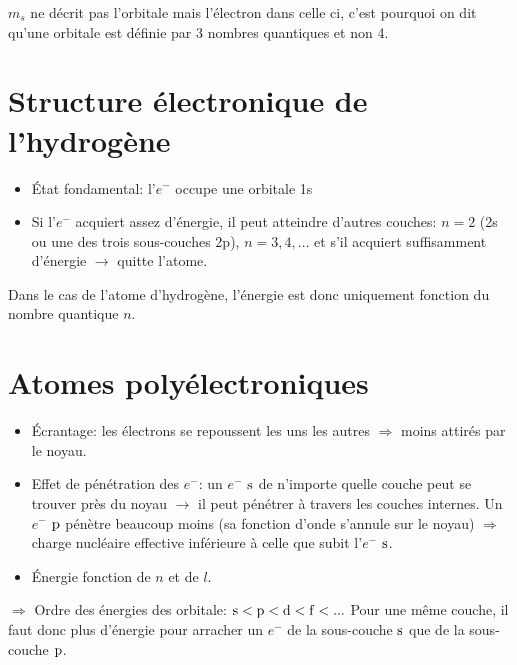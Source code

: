 $m_s$ ne décrit pas l'orbitale mais l'électron dans celle ci,
c'est pourquoi on dit qu'une orbitale est définie par 3 nombres quantiques et non 4.


\section{Structure électronique de l'hydrogène}
\begin{itemize}
  \item \'Etat fondamental: l'$e^-$ occupe une orbitale 1s
  \item Si l'$e^-$ acquiert assez d'énergie,
    il peut atteindre d'autres couches:
    $n=2$ (2s ou une des trois sous-couches 2p),
    $n=3,4,\ldots$
    et s'il acquiert suffisamment d'énergie $\rightarrow$ quitte l'atome.
\end{itemize}

Dans le cas de l'atome d'hydrogène,
l'énergie est donc uniquement fonction du nombre quantique $n$.

\section{Atomes polyélectroniques}
\begin{itemize}
  \item \'Ecrantage: les électrons se repoussent les uns les autres $\Rightarrow$ moins attirés par le noyau.
  \item Effet de pénétration des $e^-$: un $e^-$ $\mathrm{s}$ de n'importe quelle couche peut se trouver près du noyau $\rightarrow$ il peut pénétrer à travers les couches internes.
    Un $e^-$ $\mathrm{p}$ pénètre beaucoup moins (sa fonction d'onde s'annule sur le noyau) $\Rightarrow$ charge nucléaire effective inférieure à celle que subit l'$e^-$ $\mathrm{s}$.
  \item \'Energie fonction de $n$ et de $l$.
\end{itemize}
$\Rightarrow$ Ordre des énergies des orbitale: $\mathrm{s}<\mathrm{p}<\mathrm{d}<\mathrm{f}<...$
Pour une même couche,
il faut donc plus d'énergie pour arracher un $e^-$ de la sous-couche $\mathrm{s}$ que de la sous-couche $\mathrm{p}$.

